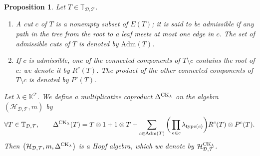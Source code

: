 \documentclass[pdftex]{sigma}
\numberwithin{equation}{section}
\newtheorem{Proposition}[Theorem]{Proposition}
 { \theoremstyle{definition}
\newtheorem{Definition}[Theorem]{Definition}
\newtheorem{Note}[Theorem]{Note}
\newtheorem{Example}[Theorem]{Example}
\newtheorem{Remark}[Theorem]{Remark}
\newtheorem{Notation}[Theorem]{Notation}}
\newcommand{\K}{\mathbb{K}}
\newcommand{\T}{\mathcal{T}}
\newcommand{\D}{\mathcal{D}}
\newcommand{\adm}{\mathrm{Adm}}
\newcommand{\h}{\mathcal{H}}
\newcommand{\bfT}{\mathbb{T}}
\newcommand{\type}{\mathrm{type}}
\begin{document}
\begin{Proposition}
Let $T\in \bfT_{\D,\T}$. \begin{enumerate}\itemsep=0pt
\item[$1.$] A cut $c$ of $T$ is a nonempty subset of $E(T)$; it is said to be admissible
if any path in the tree from the root to a leaf
meets at most one edge in $c$. The set of admissible cuts of $T$ is denoted by $\adm(T)$.
\item[$2.$] If $c$ is admissible, one of the connected components of $T\setminus c$ contains the root of $c$:
we denote it by $R^c(T)$. The product of the other connected components of $T\setminus c$ is denoted by $P^c(T)$.
\end{enumerate}
Let $\lambda\in \K^\T$. We define a multiplicative coproduct $\Delta^{{\rm CK}_\lambda}$ on the algebra $(\h_{\D,\T},m)$ by
\begin{gather*}
\forall T\in \bfT_{\D,\T},\qquad
\Delta^{{\rm CK}_\lambda}(T)=T\otimes 1+1\otimes T+\sum_{c\in \adm(T)}
\bigg(\prod_{e\in c}\lambda_{\type(e)}\bigg) R^c(T)\otimes P^c(T).
\end{gather*}
Then $\big(\h_{\D,\T},m,\Delta^{{\rm CK}_\lambda}\big)$ is a Hopf algebra, which we denote by $\h_{\D,\T}^{{\rm CK}_\lambda}$.
\end{Proposition}
\end{document}
